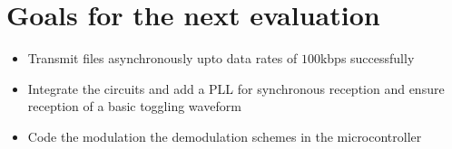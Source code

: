 \documentclass{article}
\begin{document}
\section{Goals for the next evaluation}

\begin{itemize}
\item Transmit files asynchronously upto data rates of $100$kbps successfully
\item Integrate the circuits and add a PLL for synchronous reception and ensure reception of a basic toggling waveform
\item Code the modulation the demodulation schemes in the microcontroller
\end{itemize}






\end{document}
